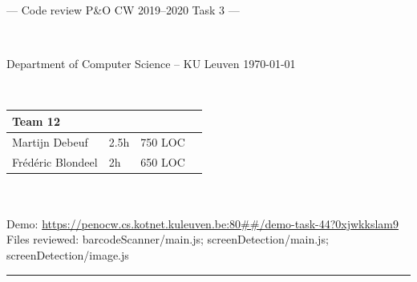 \documentclass[a4paper,11pt]{article}
\begin{document}
\noindent
\colorbox[HTML]{52BDEC}{\bfseries\parbox{\textwidth}{\centering\large
  --- Code review P\&O CW 2019--2020 Task 3 ---
}}
\\[-1mm]
\colorbox[HTML]{00407A}{\bfseries\color{white}\parbox{\textwidth}{
  Department of Computer Science -- KU Leuven
  \hfill
  \today
}}
\\

\smallskip

\noindent
\begin{tabular}{*4l}
\toprule
\multicolumn{3}{l}{\large\textbf{Team 12}} \\
\midrule
Martijn Debeuf & 2.5h & 750 LOC \\ %
Frédéric Blondeel & 2h & 650 LOC \\
\bottomrule
\hline
\end{tabular}\\
\\
Demo: \url{https://penocw.cs.kotnet.kuleuven.be:80##/demo-task-44?0xjwkkslam9} \\
Files reviewed: barcodeScanner/main.js; screenDetection/main.js; screenDetection/image.js

\noindent
{\color[HTML]{52BDEC} \rule{\linewidth}{1mm} }

\smallskip
\end{document}
